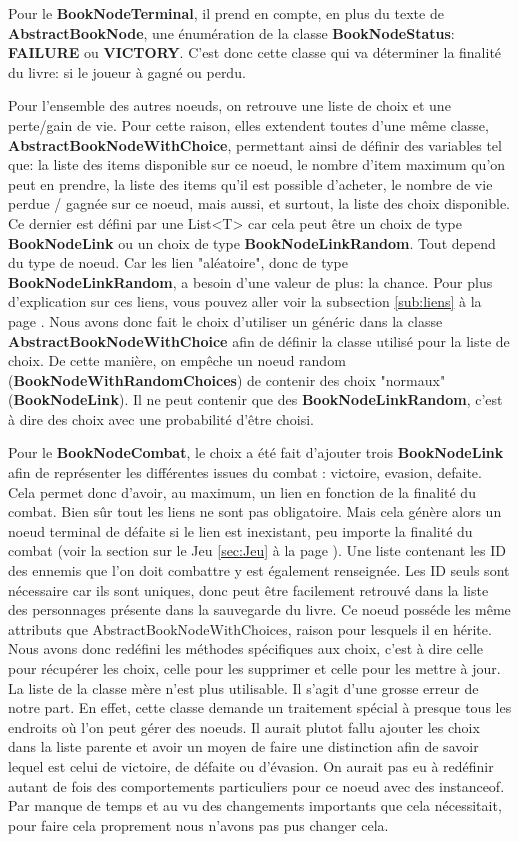 			Pour le \textbf{BookNodeTerminal}, il prend en compte, en plus du texte de \textbf{AbstractBookNode}, une énumération de la classe \textbf{BookNodeStatus}: \textbf{FAILURE} ou \textbf{VICTORY}. C'est donc cette classe qui va déterminer la finalité du livre: si le joueur à gagné ou perdu.

			Pour l'ensemble des autres noeuds, on retrouve une liste de choix et une perte/gain de vie. Pour cette raison, elles extendent toutes d'une même classe, \textbf{AbstractBookNodeWithChoice}, permettant ainsi de définir des variables tel que: la liste des items disponible sur ce noeud, le nombre d'item maximum qu'on peut en prendre, la liste des items qu'il est possible d'acheter, le nombre de vie perdue / gagnée sur ce noeud, mais aussi, et surtout, la liste des choix disponible. Ce dernier est défini par une List<T> car cela peut être un choix de type \textbf{BookNodeLink} ou un choix de type \textbf{BookNodeLinkRandom}. Tout depend du type de noeud. Car les lien "aléatoire", donc de type \textbf{BookNodeLinkRandom}, a besoin d'une valeur de plus: la chance. Pour plus d'explication sur ces liens, vous pouvez aller voir la subsection \ref{sub:liens} à la page \pageref{sub:liens}. Nous avons donc fait le choix d'utiliser un généric dans la classe \textbf{AbstractBookNodeWithChoice} afin de définir la classe utilisé pour la liste de choix. De cette manière, on empêche un noeud random (\textbf{BookNodeWithRandomChoices}) de contenir des choix "normaux" (\textbf{BookNodeLink}). Il ne peut contenir que des \textbf{BookNodeLinkRandom}, c'est à dire des choix avec une probabilité d'être choisi.

			Pour le \textbf{BookNodeCombat}, le choix a été fait d'ajouter trois \textbf{BookNodeLink} afin de représenter les différentes issues du combat : victoire, evasion, defaite. Cela permet donc d'avoir, au maximum, un lien en fonction de la finalité du combat. Bien sûr tout les liens ne sont pas obligatoire. Mais cela génère alors un noeud terminal de défaite si le lien est inexistant, peu importe la finalité du combat (voir la section sur le Jeu \ref{sec:Jeu} à la page \pageref{sec:Jeu}). Une liste contenant les ID des ennemis que l'on doit combattre y est également renseignée. Les ID seuls sont nécessaire car ils sont uniques, donc peut être facilement retrouvé dans la liste des personnages présente dans la sauvegarde du livre. Ce noeud posséde les même attributs que AbstractBookNodeWithChoices, raison pour lesquels il en hérite. Nous avons donc redéfini les méthodes spécifiques aux choix, c'est à dire celle pour récupérer les choix, celle pour les supprimer et celle pour les mettre à jour. La liste de la classe mère n'est plus utilisable. Il s'agit d'une grosse erreur de notre part. En effet, cette classe demande un traitement spécial à presque tous les endroits où l'on peut gérer des noeuds. Il aurait plutot fallu ajouter les choix dans la liste parente et avoir un moyen de faire une distinction afin de savoir lequel est celui de victoire, de défaite ou d'évasion. On aurait pas eu à redéfinir autant de fois des comportements particuliers pour ce noeud avec des instanceof. Par manque de temps et au vu des changements importants que cela nécessitait, pour faire cela proprement nous n'avons pas pus changer cela.

